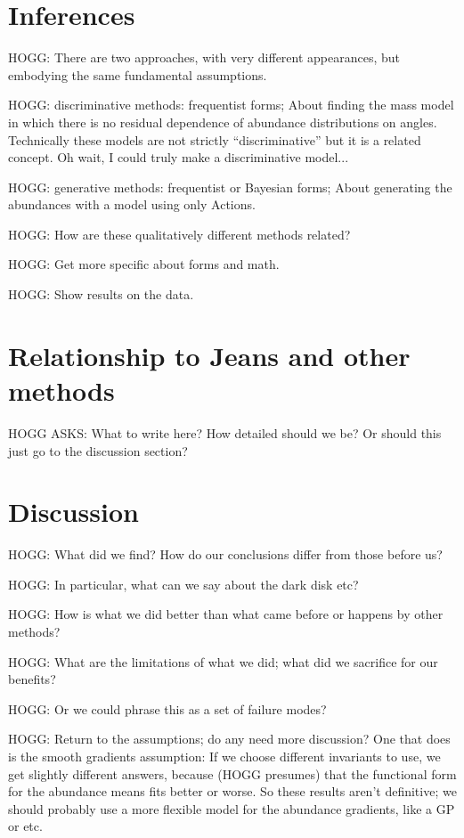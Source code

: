 \documentclass[modern]{aastex63}
\begin{document}
\section{Inferences}

HOGG: There are two approaches, with very different appearances, but
embodying the same fundamental assumptions.

HOGG: discriminative methods: frequentist forms; About finding the mass model in which
there is no residual dependence of abundance distributions on angles.
Technically these models are not strictly ``discriminative'' but it is a related
concept. Oh wait, I could truly make a discriminative model...

HOGG: generative methods: frequentist or Bayesian forms; About generating the abundances
with a model using only Actions.

HOGG: How are these qualitatively different methods related?

HOGG: Get more specific about forms and math.

HOGG: Show results on the data.

\section{Relationship to Jeans and other methods}

HOGG ASKS: What to write here? How detailed should we be? Or should this just
go to the discussion section?

\section{Discussion}

HOGG: What did we find? How do our conclusions differ from those before us?

HOGG: In particular, what can we say about the dark disk etc?

HOGG: How is what we did better than what came before or happens by other methods?

HOGG: What are the limitations of what we did; what did we sacrifice for our benefits?

HOGG: Or we could phrase this as a set of failure modes?

HOGG: Return to the assumptions; do any need more discussion? One that does is the smooth
gradients assumption: If we choose different invariants to use, we get slightly different
answers, because (HOGG presumes) that the functional form for the abundance means fits
better or worse. So these results aren't definitive; we should probably use a more flexible
model for the abundance gradients, like a GP or etc.
\end{document}
